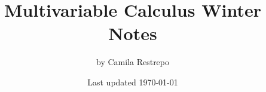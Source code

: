 \documentclass{notes}
\title{\bfseries Multivariable Calculus Winter Notes}
\author{by Camila Restrepo}
\date{Last updated \today}
\begin{document}
\maketitle
\toccontents
\frontpagewarning


\end{document}
